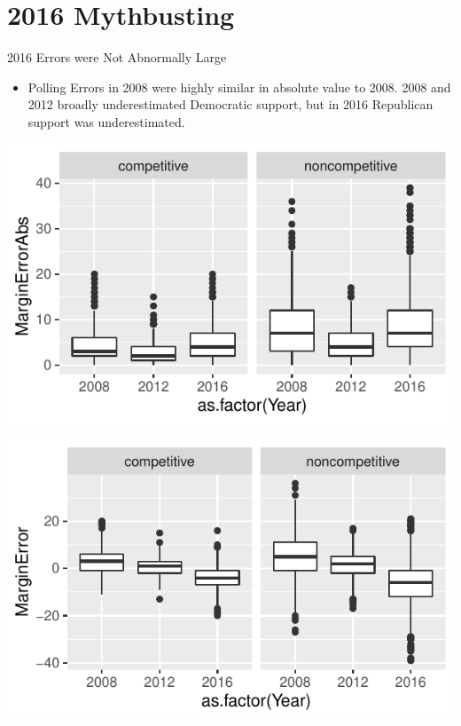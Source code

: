 \documentclass{beamer}\usepackage[]{graphicx}\usepackage[]{color}
\makeatletter
\def\maxwidth{ %
  \ifdim\Gin@nat@width>\linewidth
    \linewidth
  \else
    \Gin@nat@width
  \fi
}
\newenvironment{knitrout}{}{} %
\makeatother
\begin{document}
\section{2016 Mythbusting}
\begin{frame}{2016 Errors were Not Abnormally Large}
\begin{itemize}
\item Polling Errors in 2008 were highly similar in absolute value to 2008. 2008 and 2012 broadly underestimated Democratic support, but in 2016 Republican support was underestimated.
\end{itemize}
\begin{knitrout}
\color{fgcolor}
\includegraphics[width=\maxwidth]{figure/unnamed-chunk-8-1} 

\includegraphics[width=\maxwidth]{figure/unnamed-chunk-8-2} 

\end{knitrout}
\end{frame}
\end{document}
